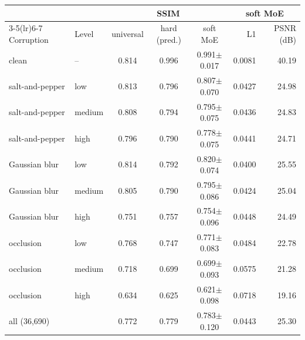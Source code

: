 \begin{tabular}{llcccrr}
\toprule
 & & \multicolumn{3}{c}{SSIM} & \multicolumn{2}{c}{soft MoE} \\
\cmidrule(lr){3-5}\cmidrule(lr){6-7}
Corruption & Level & universal & hard (pred.) & soft MoE & L1 & PSNR (dB) \\
\midrule
clean & -- & 0.814 & 0.996 & 0.991$\pm$0.017 & 0.0081 & 40.19 \\
salt-and-pepper & low & 0.813 & 0.796 & 0.807$\pm$0.070 & 0.0427 & 24.98 \\
salt-and-pepper & medium & 0.808 & 0.794 & 0.795$\pm$0.075 & 0.0436 & 24.83 \\
salt-and-pepper & high & 0.796 & 0.790 & 0.778$\pm$0.075 & 0.0441 & 24.71 \\
Gaussian blur & low & 0.814 & 0.792 & 0.820$\pm$0.074 & 0.0400 & 25.55 \\
Gaussian blur & medium & 0.805 & 0.790 & 0.795$\pm$0.086 & 0.0424 & 25.04 \\
Gaussian blur & high & 0.751 & 0.757 & 0.754$\pm$0.096 & 0.0448 & 24.49 \\
occlusion & low & 0.768 & 0.747 & 0.771$\pm$0.083 & 0.0484 & 22.78 \\
occlusion & medium & 0.718 & 0.699 & 0.699$\pm$0.093 & 0.0575 & 21.28 \\
occlusion & high & 0.634 & 0.625 & 0.621$\pm$0.098 & 0.0718 & 19.16 \\
\midrule
all (36,690) & & 0.772 & 0.779 & 0.783$\pm$0.120 & 0.0443 & 25.30 \\
\bottomrule
\end{tabular}
